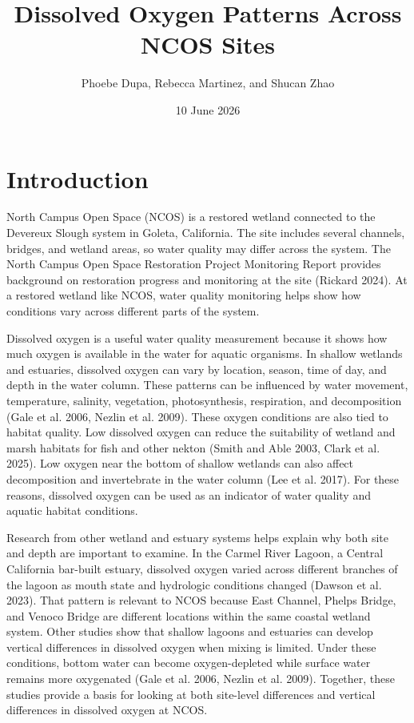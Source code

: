 \documentclass[
  letterpaper,
  DIV=11,
  numbers=noendperiod]{scrartcl}
\title{Dissolved Oxygen Patterns Across NCOS Sites}
\author{Phoebe Dupa, Rebecca Martinez, and Shucan Zhao}
\date{10 June 2026}
\renewcommand*\contentsname{Table of contents}
\newcommand\contentsname{Table of contents}
\begin{document}
\maketitle

\renewcommand*\contentsname{Table of contents}
{
\setcounter{tocdepth}{3}
\tableofcontents
}

\section{Introduction}\label{introduction}

North Campus Open Space (NCOS) is a restored wetland connected to the
Devereux Slough system in Goleta, California. The site includes several
channels, bridges, and wetland areas, so water quality may differ across
the system. The North Campus Open Space Restoration Project Monitoring
Report provides background on restoration progress and monitoring at the
site (Rickard 2024). At a restored wetland like NCOS, water quality
monitoring helps show how conditions vary across different parts of the
system.

Dissolved oxygen is a useful water quality measurement because it shows
how much oxygen is available in the water for aquatic organisms. In
shallow wetlands and estuaries, dissolved oxygen can vary by location,
season, time of day, and depth in the water column. These patterns can
be influenced by water movement, temperature, salinity, vegetation,
photosynthesis, respiration, and decomposition (Gale et al. 2006, Nezlin
et al. 2009). These oxygen conditions are also tied to habitat quality.
Low dissolved oxygen can reduce the suitability of wetland and marsh
habitats for fish and other nekton (Smith and Able 2003, Clark et al.
2025). Low oxygen near the bottom of shallow wetlands can also affect
decomposition and invertebrate in the water column (Lee et al. 2017).
For these reasons, dissolved oxygen can be used as an indicator of water
quality and aquatic habitat conditions.

Research from other wetland and estuary systems helps explain why both
site and depth are important to examine. In the Carmel River Lagoon, a
Central California bar-built estuary, dissolved oxygen varied across
different branches of the lagoon as mouth state and hydrologic
conditions changed (Dawson et al. 2023). That pattern is relevant to
NCOS because East Channel, Phelps Bridge, and Venoco Bridge are
different locations within the same coastal wetland system. Other
studies show that shallow lagoons and estuaries can develop vertical
differences in dissolved oxygen when mixing is limited. Under these
conditions, bottom water can become oxygen-depleted while surface water
remains more oxygenated (Gale et al. 2006, Nezlin et al. 2009).
Together, these studies provide a basis for looking at both site-level
differences and vertical differences in dissolved oxygen at NCOS.
\end{document}
